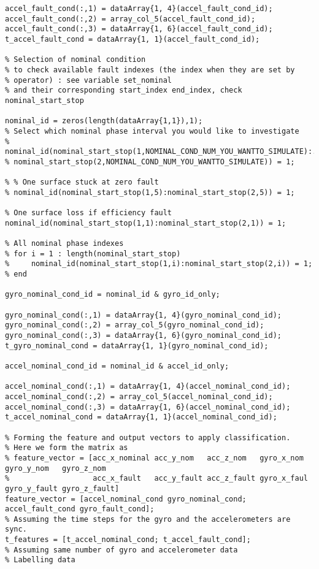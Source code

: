\begin{lstlisting}
accel_fault_cond(:,1) = dataArray{1, 4}(accel_fault_cond_id);
accel_fault_cond(:,2) = array_col_5(accel_fault_cond_id);
accel_fault_cond(:,3) = dataArray{1, 6}(accel_fault_cond_id);
t_accel_fault_cond = dataArray{1, 1}(accel_fault_cond_id);

% Selection of nominal condition
% to check available fault indexes (the index when they are set by
% operator) : see variable set_nominal
% and their corresponding start_index end_index, check nominal_start_stop

nominal_id = zeros(length(dataArray{1,1}),1);
% Select which nominal phase interval you would like to investigate
% nominal_id(nominal_start_stop(1,NOMINAL_COND_NUM_YOU_WANTTO_SIMULATE):...
% nominal_start_stop(2,NOMINAL_COND_NUM_YOU_WANTTO_SIMULATE)) = 1;

% % One surface stuck at zero fault
% nominal_id(nominal_start_stop(1,5):nominal_start_stop(2,5)) = 1;

% One surface loss if efficiency fault
nominal_id(nominal_start_stop(1,1):nominal_start_stop(2,1)) = 1;

% All nominal phase indexes
% for i = 1 : length(nominal_start_stop)
%     nominal_id(nominal_start_stop(1,i):nominal_start_stop(2,i)) = 1;
% end

gyro_nominal_cond_id = nominal_id & gyro_id_only;

gyro_nominal_cond(:,1) = dataArray{1, 4}(gyro_nominal_cond_id);
gyro_nominal_cond(:,2) = array_col_5(gyro_nominal_cond_id);
gyro_nominal_cond(:,3) = dataArray{1, 6}(gyro_nominal_cond_id);
t_gyro_nominal_cond = dataArray{1, 1}(gyro_nominal_cond_id);

accel_nominal_cond_id = nominal_id & accel_id_only;

accel_nominal_cond(:,1) = dataArray{1, 4}(accel_nominal_cond_id);
accel_nominal_cond(:,2) = array_col_5(accel_nominal_cond_id);
accel_nominal_cond(:,3) = dataArray{1, 6}(accel_nominal_cond_id);
t_accel_nominal_cond = dataArray{1, 1}(accel_nominal_cond_id);

% Forming the feature and output vectors to apply classification.
% Here we form the matrix as 
% feature_vector = [acc_x_nominal acc_y_nom   acc_z_nom   gyro_x_nom  gyro_y_nom   gyro_z_nom
%                   acc_x_fault   acc_y_fault acc_z_fault gyro_x_faul gyro_y_fault gyro_z_fault]
feature_vector = [accel_nominal_cond gyro_nominal_cond; accel_fault_cond gyro_fault_cond];
% Assuming the time steps for the gyro and the accelerometers are sync.
t_features = [t_accel_nominal_cond; t_accel_fault_cond];
% Assuming same number of gyro and accelerometer data
% Labelling data


\end{lstlisting}
